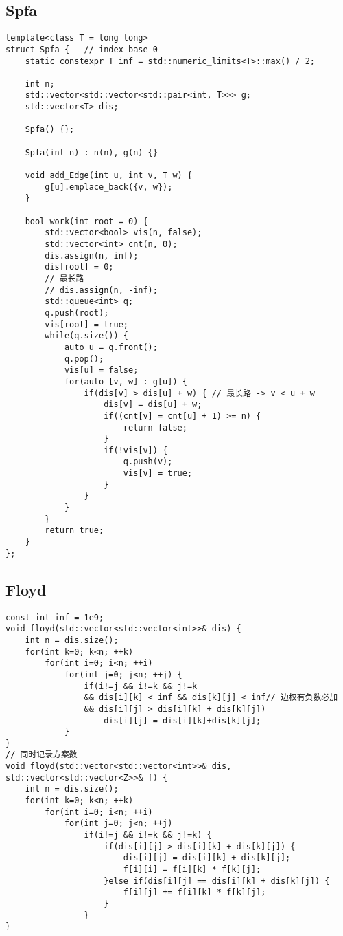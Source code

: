 \subsection{Spfa}
\begin{lstlisting}
template<class T = long long>
struct Spfa {   // index-base-0
	static constexpr T inf = std::numeric_limits<T>::max() / 2;

	int n;
	std::vector<std::vector<std::pair<int, T>>> g;
	std::vector<T> dis;

	Spfa() {};

	Spfa(int n) : n(n), g(n) {}

	void add_Edge(int u, int v, T w) {
        g[u].emplace_back({v, w});
	}

	bool work(int root = 0) {
		std::vector<bool> vis(n, false);
		std::vector<int> cnt(n, 0);
        dis.assign(n, inf);
		dis[root] = 0;
        // 最长路
        // dis.assign(n, -inf);
		std::queue<int> q;
		q.push(root);
		vis[root] = true;
		while(q.size()) {
			auto u = q.front();
			q.pop();
			vis[u] = false;
			for(auto [v, w] : g[u]) {
                if(dis[v] > dis[u] + w) { // 最长路 -> v < u + w
                    dis[v] = dis[u] + w;
                    if((cnt[v] = cnt[u] + 1) >= n) {
                        return false;
                    }
                    if(!vis[v]) {
                        q.push(v);
                        vis[v] = true;
                    }
                }
			}
		}
		return true;
	}
};
\end{lstlisting}



\subsection{Floyd}
\begin{lstlisting}
const int inf = 1e9;
void floyd(std::vector<std::vector<int>>& dis) {
    int n = dis.size();
    for(int k=0; k<n; ++k)
        for(int i=0; i<n; ++i)
            for(int j=0; j<n; ++j) {
                if(i!=j && i!=k && j!=k 
                && dis[i][k] < inf && dis[k][j] < inf// 边权有负数必加
                && dis[i][j] > dis[i][k] + dis[k][j])
                    dis[i][j] = dis[i][k]+dis[k][j];
            }
}
// 同时记录方案数
void floyd(std::vector<std::vector<int>>& dis, std::vector<std::vector<Z>>& f) {
    int n = dis.size();
    for(int k=0; k<n; ++k)
        for(int i=0; i<n; ++i)
            for(int j=0; j<n; ++j)
                if(i!=j && i!=k && j!=k) {
                    if(dis[i][j] > dis[i][k] + dis[k][j]) {
                        dis[i][j] = dis[i][k] + dis[k][j];
                        f[i][i] = f[i][k] * f[k][j];
                    }else if(dis[i][j] == dis[i][k] + dis[k][j]) {
                        f[i][j] += f[i][k] * f[k][j];
                    }
                }
}
\end{lstlisting}


